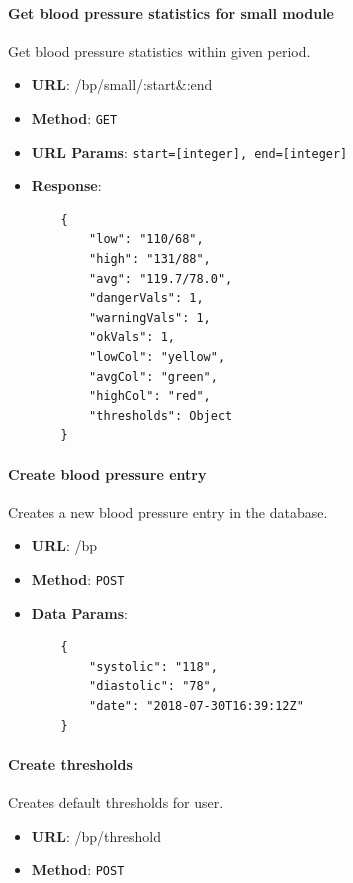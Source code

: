         \paragraph{Get blood pressure statistics for small module} Get blood pressure statistics within given period.
        \begin{itemize}
            \item \textbf{URL}: /bp/small/:start\&:end
            \item \textbf{Method}: \texttt{GET}
            \item \textbf{URL Params}: \texttt{start=[integer], end=[integer]}
            \item \textbf{Response}: \begin{verbatim}
    {
        "low": "110/68",
        "high": "131/88",
        "avg": "119.7/78.0",
        "dangerVals": 1,
        "warningVals": 1,
        "okVals": 1,
        "lowCol": "yellow",
        "avgCol": "green",
        "highCol": "red",
        "thresholds": Object
    }
            \end{verbatim}
        \end{itemize}

        \paragraph{Create blood pressure entry} Creates a new blood pressure entry in the database.
        \begin{itemize}
            \item \textbf{URL}: /bp
            \item \textbf{Method}: \texttt{POST}
            \item \textbf{Data Params}: \begin{verbatim}
    {
        "systolic": "118",
        "diastolic": "78",
        "date": "2018-07-30T16:39:12Z"
    }   
            \end{verbatim}
        \end{itemize}

        \paragraph{Create thresholds} Creates default thresholds for user.
        \begin{itemize}
            \item \textbf{URL}: /bp/threshold
            \item \textbf{Method}: \texttt{POST}
        \end{itemize}

